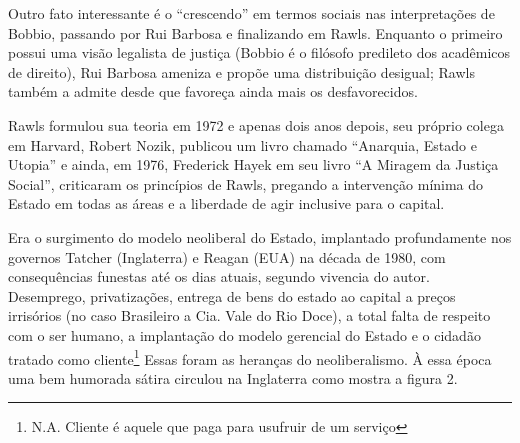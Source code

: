 \documentclass[
	12pt,				%
	openright,			%
	twoside,			%
	a4paper,			%
	chapter=TITLE,		%
	section=TITLE,		%
	subsection=TITLE,	%
	subsubsection=TITLE,%
	spanish,            %
	english,			%
	brazil				%
	]{abntex2}
\begin{document}
\par
Outro fato interessante é o “crescendo” em termos sociais nas interpretações de Bobbio, passando por Rui Barbosa e finalizando em Rawls. Enquanto o primeiro possui uma visão legalista de justiça (Bobbio é o filósofo predileto dos acadêmicos de direito), Rui Barbosa ameniza e propõe uma distribuição desigual; Rawls também a admite desde que favoreça ainda mais os desfavorecidos.
\par
Rawls formulou sua teoria em 1972 e apenas dois anos depois, seu próprio colega em Harvard, Robert Nozik, publicou um livro
chamado “Anarquia, Estado e Utopia” e ainda, em 1976, Frederick Hayek em seu livro “A Miragem da Justiça Social”, criticaram os
princípios de Rawls, pregando a intervenção mínima do Estado em todas as áreas e a liberdade de agir inclusive para o capital. 
\par
Era o surgimento do modelo neoliberal do Estado, implantado profundamente nos governos Tatcher (Inglaterra) e Reagan (EUA) na década de 1980, com consequências funestas até os dias atuais, segundo vivencia do autor. Desemprego, privatizações, entrega de bens do estado ao capital a preços irrisórios (no caso Brasileiro a Cia. Vale do Rio Doce), a total falta de respeito com o ser humano, a implantação do modelo gerencial do Estado e o cidadão tratado como cliente\footnote{N.A. Cliente é aquele que paga para usufruir de um serviço} Essas foram as heranças do neoliberalismo. À essa época uma bem humorada sátira circulou na Inglaterra como mostra a figura 2.
\end{document}
